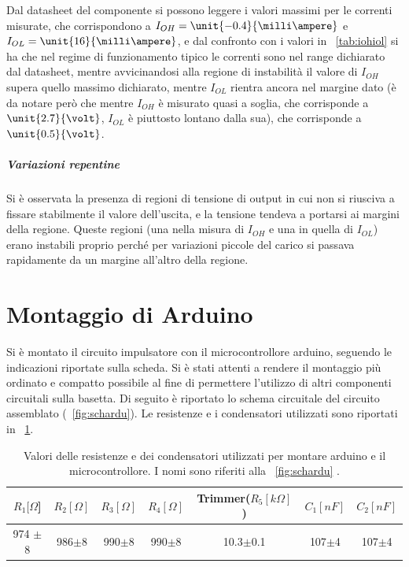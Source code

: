 \documentclass[a4paper,10pt]{article}
\begin{document}
{Dal datasheet del componente si possono leggere i valori massimi per le correnti misurate, che corrispondono a $I_{OH} = \unit{-0.4}{\milli\ampere}$ e $I_{OL} = \unit{16}{\milli\ampere}$, e dal confronto con i valori in \tablename{~\ref{tab:iohiol}} si ha che nel regime di funzionamento tipico le correnti sono nel range dichiarato dal datasheet, mentre avvicinandosi alla regione di instabilità il valore di $I_{OH}$ supera quello massimo dichiarato, mentre $I_{OL}$ rientra ancora nel margine dato (è da notare però che mentre $I_{OH}$ è misurato quasi a soglia, che corrisponde a $\unit{2.7}{\volt}$, $I_{OL}$ è piuttosto lontano dalla sua), che corrisponde a $\unit{0.5}{\volt}$.

\subparagraph{Variazioni repentine} Si è osservata la presenza di regioni di tensione di output in cui non si riusciva a fissare stabilmente il valore dell'uscita, e la tensione tendeva a portarsi ai margini della regione. Queste regioni (una nella misura di $I_{OH}$ e una in quella di $I_{OL}$) erano instabili proprio perché per variazioni piccole del carico si passava rapidamente da un margine all'altro della regione.

\section{Montaggio di Arduino}
Si è montato il circuito impulsatore con il microcontrollore arduino, seguendo le indicazioni riportate sulla scheda. Si è stati attenti a rendere il montaggio più ordinato e compatto possibile al fine di permettere l'utilizzo di altri componenti circuitali sulla basetta. Di seguito è riportato lo schema circuitale del circuito assemblato (\figurename{~\ref{fig:schardu}}). Le resistenze e i condensatori utilizzati sono riportati in \tablename{~\ref{tab:ardu}}. 

\begin{table}[H]
	\centering
	\begin{tabular}{c|c|c|c|c|c|c}
	$R_1 [\Omega$] & $R_2 [\Omega]$ & $R_3 [\Omega]$ & $R_4 [\Omega]$ & Trimmer($R_5 [k \Omega]$) & $C_1 [nF]$ & $C_2 [nF]$\\
	\hline
	974 $\pm$8 & 986$\pm$8 & 990$\pm$8& 990$\pm$8 & 10.3$\pm$0.1 & 107$\pm$4 & 107$\pm$4\\
	\hline
	\end{tabular}
	\caption{Valori delle resistenze e dei condensatori utilizzati per montare arduino e il microcontrollore. I nomi sono riferiti alla \figurename{~\ref{fig:schardu}} .}
	\label{tab:ardu}
\end{table}


}
\end{document}
